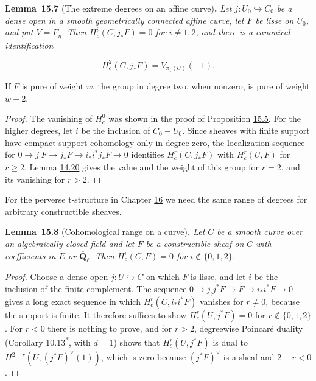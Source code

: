 \documentclass[11pt]{article}
\newenvironment{bpstatement}[2]{\par\addvspace{0.6\baselineskip}\noindent\textbf{#1}#2\textbf{.}\enspace\ignorespaces}
  {\par\addvspace{0.4\baselineskip}}
\newenvironment{bpstatementit}[2]{\begin{bpstatement}{#1}{#2}\itshape\ignorespaces}{\end{bpstatement}}
\newcommand{\bpout}[1]{#1\textsuperscript{\hyperlink{bp-outside}{\ensuremath{\ast}}}}
\begin{document}
\label{bp140}%
\begin{bpstatementit}{Lemma~15.7}{ (The extreme degrees on an affine curve)}
Let \(j:U_0\hookrightarrow C_0\) be a dense open in a smooth geometrically connected affine curve, let \(F\) be lisse on \(U_0\), and put \(V=F_{\bar\eta}\). Then \(H_c^i(C,j_*F)=0\) for \(i\ne1,2\), and there is a canonical identification

\[
H_c^2(C,j_*F)=V_{\pi_1(U)}(-1).
\]

If \(F\) is pure of weight \(w\), the group in degree two, when nonzero, is pure of weight \(w+2\).
\end{bpstatementit}

\begin{proof}[{Proof}]\label{bp141}%
The vanishing of \(H^0_c\) was shown in the proof of Proposition \hyperref[bp134]{15.5}. For the higher degrees, let \(i\) be the inclusion of \(C_0-U_0\). Since sheaves with finite support have compact-support cohomology only in degree zero, the localization sequence for \(0\to j_!F\to j_*F\to i_*i^*j_*F\to0\) identifies \(H^r_c(C,j_*F)\) with \(H_c^r(U,F)\) for \(r\ge2\). Lemma \hyperref[bp104]{14.20} gives the value and the weight of this group for \(r=2\), and its vanishing for \(r>2\).
\end{proof}

\label{bp142}%
For the perverse t-structure in Chapter \hyperref[bp167]{16} we need the same range of degrees for arbitrary constructible sheaves.

\label{bp143}%
\begin{bpstatementit}{Lemma~15.8}{ (Cohomological range on a curve)}
Let \(C\) be a smooth curve over an algebraically closed field and let \(F\) be a constructible sheaf on \(C\) with coefficients in \(E\) or \(\overline{\mathbf Q}_\ell\). Then \(H^i_c(C,F)=0\) for \(i\notin\{0,1,2\}\).
\end{bpstatementit}

\begin{proof}[{Proof}]\label{bp144}%
Choose a dense open \(j:U\hookrightarrow C\) on which \(F\) is lisse, and let \(i\) be the inclusion of the finite complement. The sequence \(0\to j_!j^*F\to F\to i_*i^*F\to0\) gives a long exact sequence in which \(H^r_c(C,i_*i^*F)\) vanishes for \(r\ne0\), because the support is finite. It therefore suffices to show \(H^r_c(U,j^*F)=0\) for \(r\notin\{0,1,2\}\). For \(r<0\) there is nothing to prove, and for \(r>2\), degreewise Poincaré duality (Corollary \bpout{10.13}, with \(d=1\)) shows that \(H^r_c(U,j^*F)\) is dual to \(H^{2-r}(U,(j^*F)^\vee(1))\), which is zero because \((j^*F)^\vee\) is a sheaf and \(2-r<0\).
\end{proof}
\end{document}
